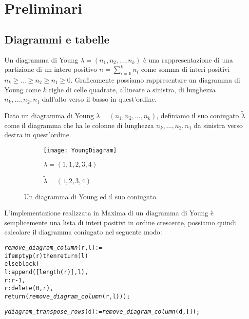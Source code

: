 \chapter{Preliminari}

\section{Diagrammi e tabelle}

\begin{defn}
Un diagramma di Young $\lambda=(n_1,n_2,\dots,n_k)$ \`e una
rappresentazione di una partizione di un intero positivo $n =
\sum_{i=0}^{k}{n_i}$ come somma di interi positivi $n_k \geq \ldots \geq
n_2 \geq n_1 \geq 0$. Graficamente possiamo rappresentare un diagramma di
Young come $k$ righe di celle quadrate, allineate a sinistra, di
lunghezza $n_k,\ldots,n_2,n_1$ dall'alto verso il basso in quest'ordine.
\end{defn}

\begin{defn}
Dato un diagramma di Young $\lambda=(n_1,n_2,\dots,n_k)$, definiamo il
suo coniugato $\tilde{\lambda}$ come il diagramma che ha le colonne di
lunghezza $n_k,\ldots,n_2,n_1$ da sinistra verso destra in quest'ordine.  
\end{defn}

\begin{figure}[h]
\centering

\begin{subfigure}[b]{0.4\textwidth}
\centering
\texttt{[image: YoungDiagram]}
\caption{$\lambda=(1,1,2,3,4)$}
\end{subfigure}%
\begin{subfigure}[b]{0.4\textwidth}
\centering
{}
\caption{$\tilde{\lambda}=(1,2,3,4)$}
\end{subfigure}
\caption{Un diagramma di Young ed il suo coniugato.}
\end{figure}

L'implementazione realizzata in Maxima di un diagramma di Young \`e
semplicemente una lista di interi positivi in ordine crescente,
possiamo quindi calcolare il diagramma coniugato nel seguente modo:

\begin{alltt}
\emph{remove\_diagram\_column} (r, l) := 
if emptyp (r) then return (l)
else block (
  l : append ([length (r)], l),
  r : r-1,
  r : delete (0, r),
  return (\emph{remove\_diagram\_column} (r, l)));

\emph{ydiagram\_transpose\_rows} (d) := \emph{remove\_diagram\_column} (d, []);
\end{alltt}

